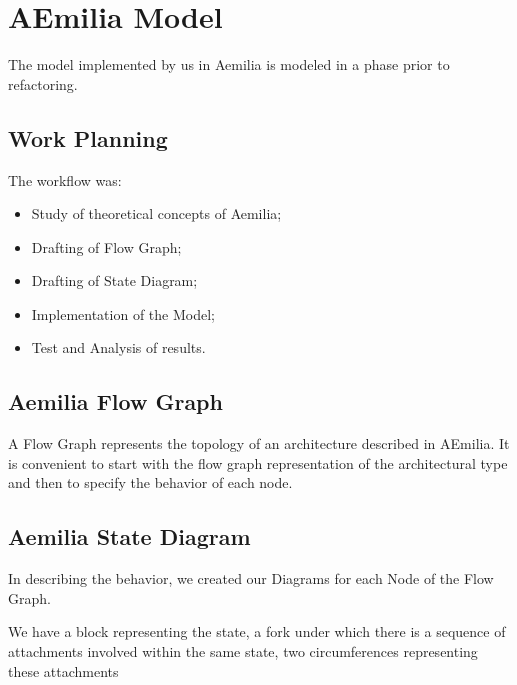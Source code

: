 \chapter{\textbf{AEmilia Model}}

The model implemented by us in Aemilia is modeled in a phase prior to refactoring.

\section{Work Planning}

The workflow was:
\begin{itemize}
\item Study of theoretical concepts of Aemilia;
\item Drafting of Flow Graph;
\item Drafting of State Diagram;
\item Implementation of the Model;
\item Test and Analysis of results.
\end{itemize}

\section{Aemilia Flow Graph}

A Flow Graph represents the topology of an architecture described in AEmilia. It is convenient to start with the flow graph representation of the architectural type and then to specify the behavior of each node.  

\begin{center}
\end{center}
\bigskip
{}

\section{Aemilia State Diagram}

In describing the behavior, we created our Diagrams for each Node of the Flow Graph.

\begin{minipage}{0.3\textwidth}
\bigskip
\end{minipage}
\hfill
\begin{minipage}{0.4\textwidth}\raggedleft
We have a block representing the state, a fork under which there is a
sequence of attachments involved within the same state, two circumferences representing these attachments
\end{minipage}
\bigskip

